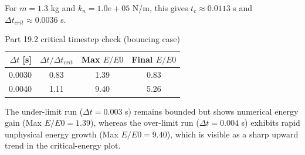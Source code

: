 For $m=1.3$ kg and $k_n=1.0e+05$ N/m, this gives $t_c\approx 0.0113$ s and $\Delta t_{crit}\approx 0.0036$ s.
\begin{table}[!t]
\centering
\caption{Part 19.2 critical timestep check (bouncing case)}
\label{tab:part19-2-critical}
\begin{tabular}{rccc}
\toprule
$\Delta t$ [s] & $\Delta t/\Delta t_{crit}$ & Max $E/E0$ & Final $E/E0$ \\
\midrule
0.0030 & 0.83 & 1.39 & 0.83 \\
0.0040 & 1.11 & 9.40 & 5.26 \\
\bottomrule
\end{tabular}
\end{table}
The under-limit run ($\Delta t=0.003$ s) remains bounded but shows numerical energy gain (Max $E/E0=1.39$), whereas the over-limit run ($\Delta t=0.004$ s) exhibits rapid unphysical energy growth (Max $E/E0=9.40$), which is visible as a sharp upward trend in the critical-energy plot.
